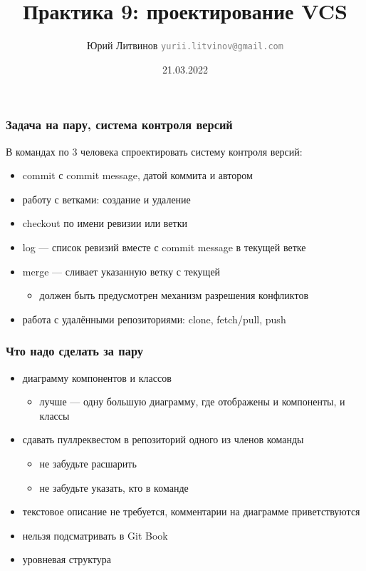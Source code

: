 \documentclass[xetex,mathserif,serif]{beamer}
\title{Практика 9: проектирование VCS}
\author[Юрий Литвинов]{Юрий Литвинов \newline \textcolor{gray}{\small\texttt{yurii.litvinov@gmail.com}}}
\date{21.03.2022}
\begin{document}
    
    \frame{\titlepage}

    \begin{frame}
        \frametitle{Задача на пару, система контроля версий}
        В командах по 3 человека спроектировать систему контроля версий:
        \begin{itemize}
            \item commit с commit message, датой коммита и автором
            \item работу с ветками: создание и удаление
            \item checkout по имени ревизии или ветки
            \item log --- список ревизий вместе с commit message в текущей ветке
            \item merge --- сливает указанную ветку с текущей
            \begin{itemize}
                \item должен быть предусмотрен механизм разрешения конфликтов
            \end{itemize}
            \item работа с удалёнными репозиториями: clone, fetch/pull, push
        \end{itemize}
    \end{frame}

    \begin{frame}
        \frametitle{Что надо сделать за пару}
        \begin{itemize}
            \item диаграмму компонентов и классов
            \begin{itemize}
                \item лучше --- одну большую диаграмму, где отображены и компоненты, и классы
            \end{itemize}
            \item сдавать пуллреквестом в репозиторий одного из членов команды
            \begin{itemize}
                \item не забудьте расшарить
                \item не забудьте указать, кто в команде
            \end{itemize}
            \item текстовое описание не требуется, комментарии на диаграмме приветствуются
            \item нельзя подсматривать в Git Book
            \item уровневая структура
        \end{itemize}
    \end{frame}
\end{document}
